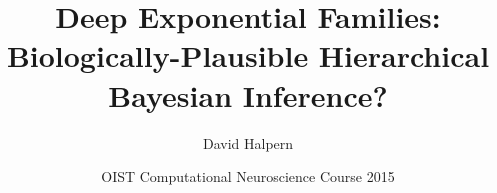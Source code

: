 \documentclass{beamer}
\title[Short Paper Title] %
{Deep Exponential Families: Biologically-Plausible Hierarchical Bayesian Inference?}
\author[Author] %
{David Halpern}
\institute[NYU] %
{Department of Psychology\\
  New York University}
\date[OCNC] %
{OIST Computational Neuroscience Course 2015}
\begin{document}
\begin{frame}
  \titlepage
\end{frame}



\end{document}

